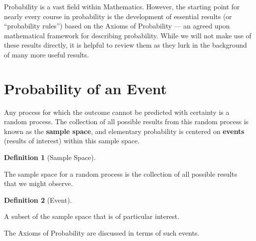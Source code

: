 \documentclass[
  letterpaper,
  DIV=11,
  numbers=noendperiod]{scrreprt}
\theoremstyle{definition}
\newtheorem{definition}{Definition}[chapter]
\theoremstyle{plain}
\theoremstyle{definition}
\theoremstyle{remark}
\begin{document}
\providecommand{\bm}[1]{\mathbf{#1}}
\providecommand{\bs}[1]{\boldsymbol{#1}}
\providecommand{\bbeta}{\bs{\beta}}

\providecommand{\Ell}{\mathcal{L}}
\providecommand{\indep}{\perp\negthickspace\negmedspace\perp}

Probability is a vast field within Mathematics. However, the starting
point for nearly every course in probability is the development of
essential results (or ``probability rules'') based on the Axioms of
Probability --- an agreed upon mathematical framework for describing
probability. While we will not make use of these results directly, it is
helpful to review them as they lurk in the background of many more
useful results.

\hypertarget{probability-of-an-event}{%
\section{Probability of an Event}\label{probability-of-an-event}}

Any process for which the outcome cannot be predicted with certainty is
a random process. The collection of all possible results from this
random process is known as the \textbf{sample space}, and elementary
probability is centered on \textbf{events} (results of interest) within
this sample space.

\begin{definition}[Sample
Space]\protect\hypertarget{def-sample-space}{}\label{def-sample-space}

The sample space for a random process is the collection of all possible
results that we might observe.

\end{definition}

\begin{definition}[Event]\protect\hypertarget{def-event}{}\label{def-event}

A subset of the sample space that is of particular interest.

\end{definition}

The Axioms of Probability are discussed in terms of such events.
\end{document}
